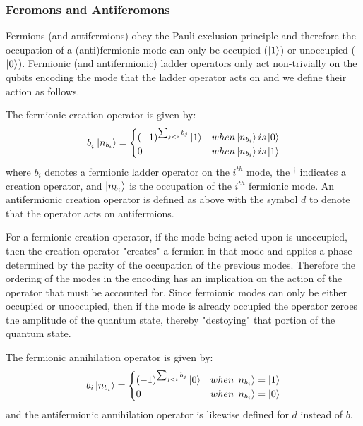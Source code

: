 \subsubsection{Feromons and Antiferomons}


Fermions (and antifermions) obey the Pauli-exclusion principle  and therefore the occupation of a (anti)fermionic mode can only be occupied ($\ket{1}$) or unoccupied ($\ket{0}$).
Fermionic (and antifermionic) ladder operators only act non-trivially on the qubits encoding the mode that the ladder operator acts on and we define their action as follows.

The fermionic creation operator is given by:
\begin{equation}
    b_i^\dagger \ket{n_{b_i}} = 
    \begin{cases} 
        (-1)^{\sum_{j < i} b_j} \ket{1}  & when \ket{n_{b_i}} is \ket{0} \\
        0 & when \ket{n_{b_i}} is \ket{1}
    \end{cases}
\end{equation}
where $b_i$ denotes a fermionic ladder operator on the $i^{th}$ mode, the $^\dagger$ indicates a creation operator, and $\ket{n_{b_i}}$ is the occupation of the $i^{th}$ fermionic mode.
An antifermionic creation operator is defined as above with the symbol $d$ to denote that the operator acts on antifermions.

For a fermionic creation operator, if the mode being acted upon is unoccupied, then the creation operator "creates" a fermion in that mode and applies a phase determined by the parity of the occupation of the previous modes.
Therefore the ordering of the modes in the encoding has an implication on the action of the operator that must be accounted for.
Since fermionic modes can only be either occupied or unoccupied, then if the mode is already occupied the operator zeroes the amplitude of the quantum state, thereby "destoying" that portion of the quantum state. 

The fermionic annihilation operator is given by:
\begin{equation}
    b_i \ket{n_{b_i}} = 
    \begin{cases} 
        (-1)^{\sum_{j < i} b_j} \ket{0}  & when \ket{n_{b_i}} = \ket{1} \\
        0 & when \ket{n_{b_i}} = \ket{0}
    \end{cases}
\end{equation}
and the antifermionic annihilation operator is likewise defined for $d$ instead of $b$.

